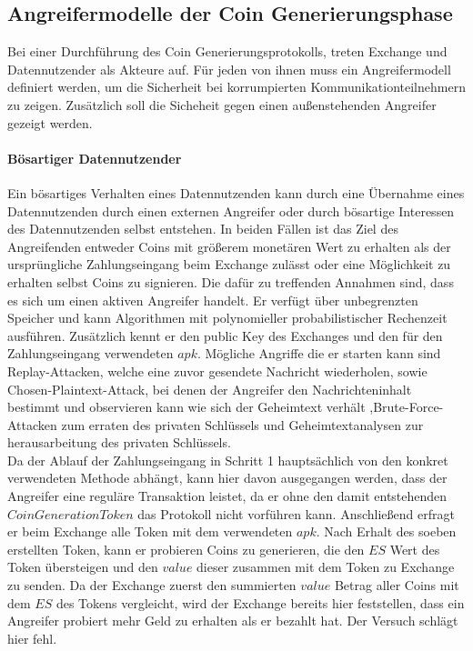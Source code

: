 \documentclass{scrreprt}
\begin{document}
\subsection{Angreifermodelle der Coin Generierungsphase}
Bei einer Durchführung des Coin Generierungsprotokolls, treten Exchange und Datennutzender als Akteure auf. Für jeden von ihnen muss ein Angreifermodell definiert werden, um die Sicherheit bei korrumpierten Kommunikationteilnehmern zu zeigen. Zusätzlich soll die Sicheheit gegen einen außenstehenden Angreifer gezeigt werden.

\paragraph{Bösartiger Datennutzender}
Ein bösartiges Verhalten eines Datennutzenden kann durch eine Übernahme eines Datennutzenden durch einen externen Angreifer oder durch bösartige Interessen des Datennutzenden selbst entstehen. In beiden Fällen ist das Ziel des Angreifenden entweder Coins mit größerem monetären Wert zu erhalten als der ursprüngliche Zahlungseingang beim Exchange zulässt oder eine Möglichkeit zu erhalten selbst Coins zu signieren. Die dafür zu treffenden Annahmen sind, dass es sich um einen aktiven Angreifer handelt. Er verfügt über unbegrenzten Speicher und kann Algorithmen mit polynomieller probabilistischer Rechenzeit ausführen. Zusätzlich kennt er den public Key des Exchanges und den für den Zahlungseingang verwendeten $apk$. Mögliche Angriffe die er starten kann sind Replay-Attacken, welche eine zuvor gesendete Nachricht wiederholen, sowie Chosen-Plaintext-Attack, bei denen der Angreifer den Nachrichteninhalt bestimmt und observieren kann wie sich der Geheimtext verhält ,Brute-Force-Attacken zum erraten des privaten Schlüssels und Geheimtextanalysen zur herausarbeitung des privaten Schlüssels.\\

Da der Ablauf der Zahlungseingang in Schritt 1 hauptsächlich von den konkret verwendeten Methode abhängt, kann hier davon ausgegangen werden, dass der Angreifer eine reguläre Transaktion leistet, da er ohne den damit entstehenden $CoinGenerationToken$ das Protokoll nicht vorführen kann. 
Anschließend erfragt er beim Exchange alle Token mit dem verwendeten $apk$. Nach Erhalt des soeben erstellten Token, kann er probieren Coins zu generieren, die den $ES$ Wert des Token übersteigen und den $value$ dieser zusammen mit dem Token zu Exchange zu senden. Da der Exchange zuerst den summierten $value$ Betrag aller Coins mit dem $ES$ des Tokens vergleicht, wird der Exchange bereits hier feststellen, dass ein Angreifer probiert mehr Geld zu erhalten als er bezahlt hat. Der Versuch schlägt hier fehl.\\
\end{document}

